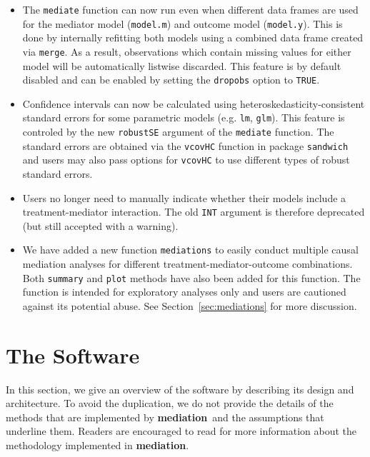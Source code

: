 \documentclass[11pt,letterpaper]{article}
\theoremstyle{plain}
\newcommand\bmediation{{\bf mediation}}
\begin{document}
\begin{itemize}
\item The {\tt mediate} function can now run even when different data frames are used
for the mediator model ({\tt model.m}) and outcome model ({\tt model.y}).  This is
done by internally refitting both models using a combined data frame created via {\tt merge}.  
As a result, observations which contain missing values for either model will be 
automatically listwise discarded.  This feature is by default disabled and can be
enabled by setting the {\tt dropobs} option to {\tt TRUE}.

\item Confidence intervals can now be calculated using heteroskedasticity-consistent
standard errors for some parametric models (e.g. {\tt lm}, {\tt glm}).  This
feature is controled by the new {\tt robustSE} argument of the {\tt mediate} function.
The standard errors are obtained via the {\tt vcovHC} function in package {\tt sandwich}
and users may also pass options for {\tt vcovHC} to use different types of
robust standard errors.

\item Users no longer need to manually indicate whether their models include a treatment-mediator
interaction.  The old {\tt INT} argument is therefore deprecated (but still accepted
with a warning).

\item We have added a new function {\tt mediations} to easily conduct multiple 
causal mediation analyses for different treatment-mediator-outcome combinations.
Both {\tt summary} and {\tt plot} methods have also been added for this function.
The function is intended for exploratory analyses only and users are cautioned against
its potential abuse.  See Section~\ref{sec:mediations} for more discussion.

\end{itemize}

\section{The Software}

In this section, we give an overview of the software by describing its
design and architecture.  To avoid the duplication, we do not provide
the details of the methods that are implemented by \bmediation\ and
the assumptions that underline them.  Readers are encouraged to read
\citet{imai:keel:yama:10,imai:keel:ting:10} for more information about
the methodology implemented in \bmediation.
\end{document}
